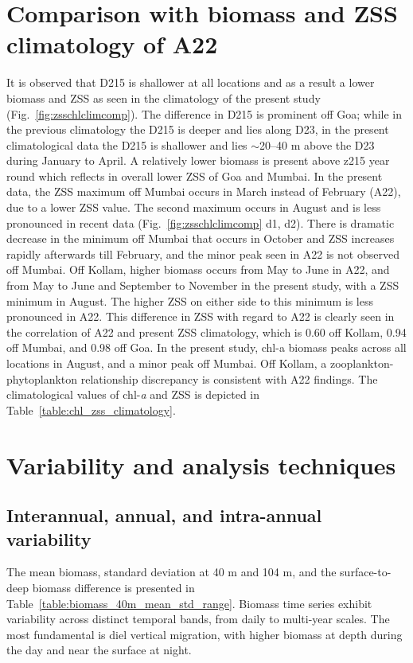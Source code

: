 \documentclass[12pt,a4paper]{article}
\begin{document}
\section{Comparison with biomass and ZSS climatology of A22}	
\label{sec:comparison} 	
It is observed that D215 is shallower at all locations and as a result a lower biomass and ZSS as seen in the climatology of the present study (Fig.~\ref{fig:zsschlclimcomp}). The difference in D215 is prominent off Goa; while in the previous climatology  the D215 is deeper and lies along D23, in the present climatological data the D215 is shallower and lies $\sim$20--40 m above the D23 during January to April. A relatively lower biomass is present above z215 year round which reflects in overall lower ZSS of Goa and Mumbai. In the present data, the ZSS maximum off Mumbai occurs in March instead of February (A22), due to a lower ZSS value. The second maximum occurs in August and is less pronounced in recent data (Fig.~\ref{fig:zsschlclimcomp} d1, d2). There is dramatic decrease in the minimum off Mumbai that occurs in October and ZSS increases rapidly afterwards till February, and the minor peak seen in A22 is not observed off Mumbai. Off Kollam, higher biomass occurs from May to June in A22, and from May to June and September to November in the present study, with a ZSS minimum in August. The higher ZSS on either side to this minimum is less pronounced in A22. This difference in ZSS with regard to A22 is clearly seen in the correlation of A22 and present ZSS climatology, which is 0.60 off Kollam, 0.94 off Mumbai, and 0.98 off Goa. In the present study, chl-a biomass peaks across all locations in August, and a minor peak off Mumbai. Off Kollam, a zooplankton-phytoplankton relationship discrepancy is consistent with A22 findings. The climatological values of chl-\textit{a} and ZSS is depicted in Table~\ref{table:chl_zss_climatology}.
	
\section{Variability and analysis techniques}
\label{sec:seasonlity_analysis}
\subsection{Interannual, annual, and intra-annual variability}
\label{sec:seasonal_cycle}

The mean biomass, standard deviation at 40 m and 104 m, and the surface-to-deep biomass difference is presented in Table~\ref{table:biomass_40m_mean_std_range}. Biomass time series exhibit variability across distinct temporal bands, from daily to multi-year scales. The most fundamental is diel vertical migration, with higher biomass at depth during the day and near the surface at night. 
\end{document}
